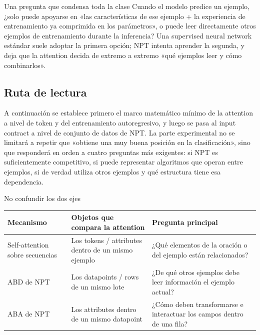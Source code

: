 \documentclass[a4paper]{article}
\begin{document}
\begin{importantbox}{Una pregunta que condensa toda la clase}
Cuando el modelo predice un ejemplo, ¿solo puede apoyarse en «las características de ese ejemplo + la experiencia de entrenamiento ya comprimida en los parámetros», o puede leer directamente otros ejemplos de entrenamiento durante la inferencia? Una supervised neural network estándar suele adoptar la primera opción; NPT intenta aprender la segunda, y deja que la attention decida de extremo a extremo «qué ejemplos leer y cómo combinarlos».
\end{importantbox}


\subsection{Ruta de lectura}

A continuación se establece primero el marco matemático mínimo de la attention a nivel de token y del entrenamiento autoregresivo, y luego se pasa al input contract a nivel de conjunto de datos de NPT. La parte experimental no se limitará a repetir que «obtiene una muy buena posición en la clasificación», sino que responderá en orden a cuatro preguntas más exigentes: si NPT es suficientemente competitivo, si puede representar algoritmos que operan entre ejemplos, si de verdad utiliza otros ejemplos y qué estructura tiene esa dependencia.

\begin{knowledgebox}{No confundir los dos ejes}
\begin{tabularx}{\textwidth}{L{0.23\textwidth}>{\raggedright\arraybackslash}X >{\raggedright\arraybackslash}X}
\toprule
Mecanismo & Objetos que compara la attention & Pregunta principal \\
\midrule
Self-attention sobre secuencias & Los tokens / attributes dentro de un mismo ejemplo & ¿Qué elementos de la oración o del ejemplo están relacionados? \\
ABD de NPT & Los datapoints / rows de un mismo lote & ¿De qué otros ejemplos debe leer información el ejemplo actual? \\
ABA de NPT & Los attributes dentro de un mismo datapoint & ¿Cómo deben transformarse e interactuar los campos dentro de una fila? \\
\bottomrule
\end{tabularx}
\end{knowledgebox}
\end{document}
